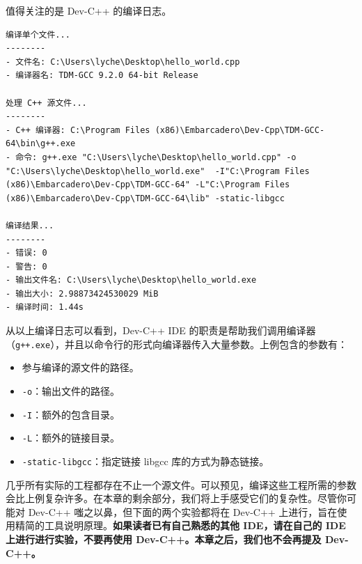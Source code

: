 值得关注的是 Dev-C++ 的编译日志。

\begin{lstlisting}[language={}]
编译单个文件...
--------
- 文件名: C:\Users\lyche\Desktop\hello_world.cpp
- 编译器名: TDM-GCC 9.2.0 64-bit Release

处理 C++ 源文件...
--------
- C++ 编译器: C:\Program Files (x86)\Embarcadero\Dev-Cpp\TDM-GCC-64\bin\g++.exe
- 命令: g++.exe "C:\Users\lyche\Desktop\hello_world.cpp" -o "C:\Users\lyche\Desktop\hello_world.exe"  -I"C:\Program Files (x86)\Embarcadero\Dev-Cpp\TDM-GCC-64" -L"C:\Program Files (x86)\Embarcadero\Dev-Cpp\TDM-GCC-64\lib" -static-libgcc

编译结果...
--------
- 错误: 0
- 警告: 0
- 输出文件名: C:\Users\lyche\Desktop\hello_world.exe
- 输出大小: 2.98873424530029 MiB
- 编译时间: 1.44s
\end{lstlisting}

从以上编译日志可以看到，Dev-C++ IDE 的职责是帮助我们调用编译器（\lstinline[language={}]{g++.exe}），并且以命令行的形式向编译器传入大量参数。上例包含的参数有：

\begin{itemize}
	\item 参与编译的源文件的路径。
	\item \lstinline[language={}]{-o}：输出文件的路径。
	\item \lstinline[language={}]{-I}：额外的包含目录。
	\item \lstinline[language={}]{-L}：额外的链接目录。
	\item \lstinline[language={}]{-static-libgcc}：指定链接 libgcc 库的方式为静态链接。
\end{itemize}

几乎所有实际的工程都存在不止一个源文件。可以预见，编译这些工程所需的参数会比上例复杂许多。在本章的剩余部分，我们将上手感受它们的复杂性。尽管你可能对 Dev-C++ 嗤之以鼻，但下面的两个实验都将在 Dev-C++ 上进行，旨在使用精简的工具说明原理。\textbf{如果读者已有自己熟悉的其他 IDE，请在自己的 IDE 上进行进行实验，不要再使用 Dev-C++。本章之后，我们也不会再提及 Dev-C++。}
